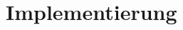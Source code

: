 \documentclass[Bachelorarbeit.tex]{subfiles}
\begin{document}
\chapter{Implementierung}
\label{chap:implementierung}
\end{document}
